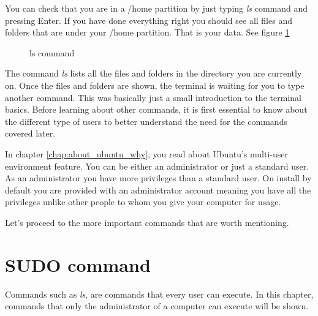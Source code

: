 \par \noindent You can check that you are in a /home partition by just typing \textit{ls} command and pressing Enter. If you have done everything right you should see all files and folders that are under your /home partition. That is your data. See figure \ref{fig:ls-command} \\

\begin{figure}[h]	
	\centering
	\caption{ls command}	
	\label{fig:ls-command}	
\end{figure}

\par \noindent The command \textit{ls} lists all the files and folders in the directory you are currently on. Once the files and folders are shown, the terminal is waiting for you to type another command. This was basically just a small introduction to the terminal basics. Before learning about other commands, it is first essential to know about the different type of users to better understand the need for the commands covered later. \\

\par \noindent In chapter \ref{chap:about_ubuntu_why},  you read about Ubuntu's multi-user environment feature. You can be either an administrator or just a standard user. As an administrator you have more privileges than a standard user. On install by default you are provided with an administrator account meaning you have all the privileges unlike other people to whom you give  your computer for usage. \\

\par \noindent Let's proceed to the more important commands that are worth mentioning.

\section{SUDO command}  
Commands such as \textit{ls}, are commands that every user can execute. In this chapter, commands that only the administrator of a computer can execute will be shown. \\

